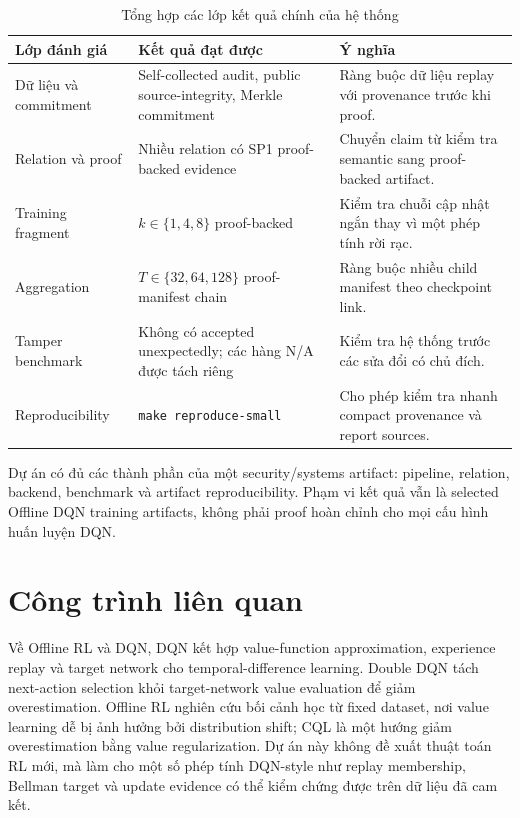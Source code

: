 \documentclass[12pt,a4paper,oneside]{report}
\newcommand{\code}[1]{\texttt{#1}}
\begin{document}
\begin{table}[H]
\centering
\caption{Tổng hợp các lớp kết quả chính của hệ thống}
\begin{tabularx}{\textwidth}{p{} p{} p{}}
\toprule
Lớp đánh giá & Kết quả đạt được & Ý nghĩa \\
\midrule
Dữ liệu và commitment & Self-collected audit, public source-integrity, Merkle commitment & Ràng buộc dữ liệu replay với provenance trước khi proof. \\
Relation và proof & Nhiều relation có SP1 proof-backed evidence & Chuyển claim từ kiểm tra semantic sang proof-backed artifact. \\
Training fragment & \(k \in \{1,4,8\}\) proof-backed & Kiểm tra chuỗi cập nhật ngắn thay vì một phép tính rời rạc. \\
Aggregation & \(T \in \{32,64,128\}\) proof-manifest chain & Ràng buộc nhiều child manifest theo checkpoint link. \\
Tamper benchmark & Không có accepted unexpectedly; các hàng N/A được tách riêng & Kiểm tra hệ thống trước các sửa đổi có chủ đích. \\
Reproducibility & \code{make reproduce-small} & Cho phép kiểm tra nhanh compact provenance và report sources. \\
\bottomrule
\end{tabularx}
\end{table}

Dự án có đủ các thành phần của một security/systems artifact: pipeline, relation, backend, benchmark và artifact reproducibility. Phạm vi kết quả vẫn là selected Offline DQN training artifacts, không phải proof hoàn chỉnh cho mọi cấu hình huấn luyện DQN.

\section{Công trình liên quan}

Về Offline RL và DQN, DQN kết hợp value-function approximation, experience replay và target network cho temporal-difference learning. Double DQN tách next-action selection khỏi target-network value evaluation để giảm overestimation. Offline RL nghiên cứu bối cảnh học từ fixed dataset, nơi value learning dễ bị ảnh hưởng bởi distribution shift; CQL là một hướng giảm overestimation bằng value regularization. Dự án này không đề xuất thuật toán RL mới, mà làm cho một số phép tính DQN-style như replay membership, Bellman target và update evidence có thể kiểm chứng được trên dữ liệu đã cam kết.
\end{document}
